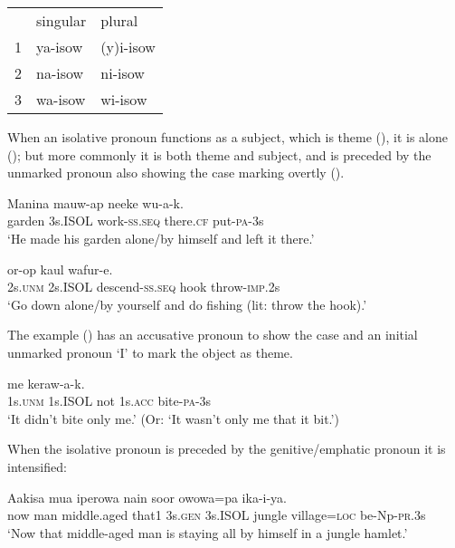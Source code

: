 \begin{table}
\caption{}
\label{} 
\begin{tabular}{lll}
&singular &plural\\
1 &ya-isow &(y)i-isow\\
2 &na-isow &ni-isow\\
3 &wa-isow &wi-isow\\
\end{tabular}
\end{table}


When an isolative pronoun functions as a subject, which is  theme (), it is alone (); but more commonly it is both theme and subject, and is preceded by the unmarked pronoun also showing the case marking overtly (). 

\ea%
\label{ex:x599}
\gll Manina  mauw-ap neeke wu-a-k. \\
garden 3s.ISOL work-\textsc{ss}.\textsc{seq} there.\textsc{cf} put-\textsc{pa}-3s\\
\glt`He made his garden alone/by himself and left it there.'
\z

\ea%
\label{ex:x600}
\gll {}  or-op kaul wafur-e. \\
2s.\textsc{unm} 2s.ISOL descend-\textsc{ss}.\textsc{seq} hook throw-\textsc{imp}.2s\\
\glt`Go down alone/by yourself and do fishing (lit: throw the hook).'
\z

The example () has an accusative pronoun to show the case and an initial unmarked pronoun  `I' to mark the object as theme.

\ea%
\label{ex:x601}
\gll {}  me  keraw-a-k. \\
1s.\textsc{unm} 1s.ISOL not 1s.\textsc{acc} bite-\textsc{pa}-3s\\
\glt`It didn't bite only me.' (Or: `It wasn't only me that it bit.')
\z

When the isolative pronoun is preceded by the genitive/emphatic pronoun it is intensified:

\ea%
\label{ex:x1813}
\gll Aakisa mua iperowa nain   soor owowa=pa ika-i-ya.\\
now man middle.aged that1 3s.\textsc{gen} 3s.ISOL jungle village=\textsc{loc} be-Np-\textsc{pr}.3s\\
\glt`Now that middle-aged man is staying all by himself in a jungle hamlet.'
\z

